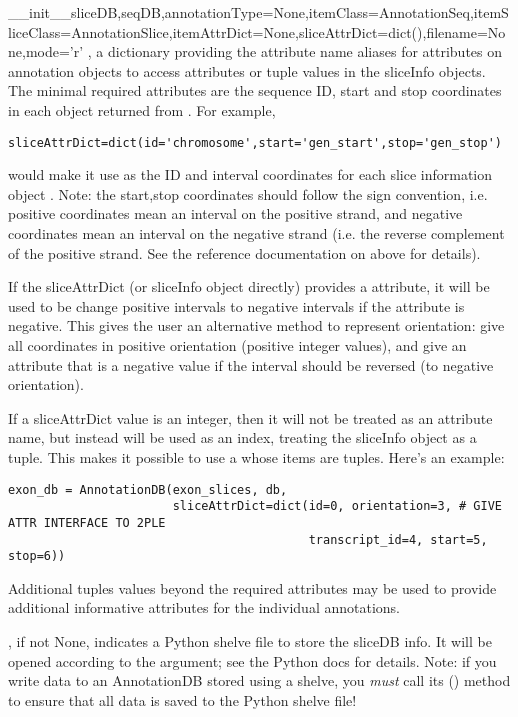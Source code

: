 \documentclass{howto}
\begin{document}
\begin{funcdesc}{__init__}{sliceDB,seqDB,annotationType=None,itemClass=AnnotationSeq,itemSliceClass=AnnotationSlice,itemAttrDict=None,sliceAttrDict=dict(),filename=None,mode='r'}
  , a dictionary providing the attribute name aliases
  for attributes on annotation objects to access attributes or tuple values
  in the sliceInfo objects.  The minimal required attributes are the
  sequence ID, start and stop coordinates in each object returned from .
  For example,
\begin{verbatim}
sliceAttrDict=dict(id='chromosome',start='gen_start',stop='gen_stop')
\end{verbatim}
  would make it use  as the ID and interval
  coordinates for each slice information object .  Note: the start,stop
  coordinates should follow the  sign convention, i.e. positive
  coordinates mean an interval on the positive strand, and negative coordinates
  mean an interval on the negative strand (i.e. the reverse complement of
  the positive strand.  See the reference documentation on  above
  for details).

  If the sliceAttrDict (or sliceInfo object directly) provides a 
  attribute, it will be used to be change positive intervals to negative intervals
  if the  attribute is negative.  This gives the user an alternative
  method to represent orientation: give all coordinates in positive orientation
  (positive integer values), and give an  attribute that
  is a negative value if the interval should be reversed (to negative orientation).

  If a sliceAttrDict value is an integer, then it will not be treated as an
  attribute name, but instead will be used as an index, treating the sliceInfo
  object as a tuple.  This makes it possible to use a  whose
  items are tuples.  Here's an example:
\begin{verbatim}
exon_db = AnnotationDB(exon_slices, db,
                       sliceAttrDict=dict(id=0, orientation=3, # GIVE ATTR INTERFACE TO 2PLE
                                          transcript_id=4, start=5, stop=6))
\end{verbatim}
  Additional tuples values beyond the required 
  attributes may be used to provide additional informative attributes
  for the individual annotations.

  , if not None, indicates a Python shelve file to store the
  sliceDB info.  It will be opened according to the  argument; 
  see the Python  docs for details.  Note: if you write data
  to an AnnotationDB stored using a shelve, you {\em must} call its
  () method to ensure that all data is saved to the Python
  shelve file!
\end{funcdesc}
\end{document}
